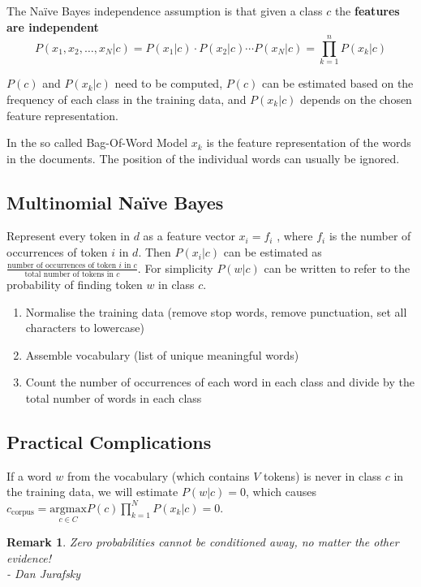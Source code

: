 \documentclass[11pt]{article}
\newtheorem*{remark}{Remark}
\begin{document}
The Naïve Bayes independence assumption is that given a class $c$ the \textbf{features are independent}
\begin{equation*}
	P(x_1, x_2, \dots , x_N | c) = P(x_1|c)\cdot P(x_2|c) \cdots P(x_N|c) = \prod_{k=1}^{n}P(x_k|c)
\end{equation*}

$P(c)$ and $P(x_k|c)$ need to be computed, $P(c)$ can be estimated based on the frequency of each class in the training data, and $P(x_k|c)$ depends on the chosen feature representation.

In the so called Bag-Of-Word Model $x_k$ is the feature representation of the words in the documents. The position of the individual words can usually be ignored.

\subsection{Multinomial Naïve Bayes}
Represent every token in $d$ as a feature vector $x_i = f_i$ , where $f_i$ is the number of occurrences of token $i$ in $d$. Then $P(x_i|c)$ can be estimated as $\frac{\text{number of occurrences of token }i\text{ in }c}{\text{total number of tokens in }c}$. For simplicity $P(w|c)$ can be written to refer to the probability of finding token $w$ in class $c$.

\begin{enumerate}
	\item Normalise the training data (remove stop words, remove punctuation, set all characters to lowercase)
	\item Assemble vocabulary (list of unique meaningful words)
	\item Count the number of occurrences of each word in each class and divide by the total number of words in each class
\end{enumerate}

\subsection{Practical Complications}
If a word $w$ from the vocabulary (which contains $V$ tokens) is never in class $c$ in the training data, we will estimate $P(w|c) = 0$, which causes $c_{\text{corpus}}=\underset{c\in C}{\text{argmax}}P(c)\prod_{k=1}^{N}P(x_k|c)=0$.

\begin{remark}
	Zero probabilities cannot be conditioned away, no matter the other evidence!\\ - Dan Jurafsky
\end{remark}
\end{document}
